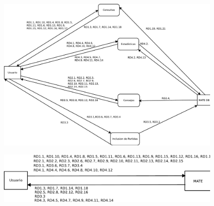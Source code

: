 \begin{figure}
\centering
\includegraphics[width=0.7\linewidth]{../../Diagramas/pdf/Armazon}
\caption[Diagrama Armazón]{}
\caption{}
\label{fig:Armazon}
\end{figure}


\begin{figure}
\centering
\includegraphics[width=0.7\linewidth]{../../Diagramas/pdf/CajaNegra}
\caption[Diagrama caja negra para el sistema MATE]{}
\caption{}
\label{fig:CajaNegra}
\end{figure}
